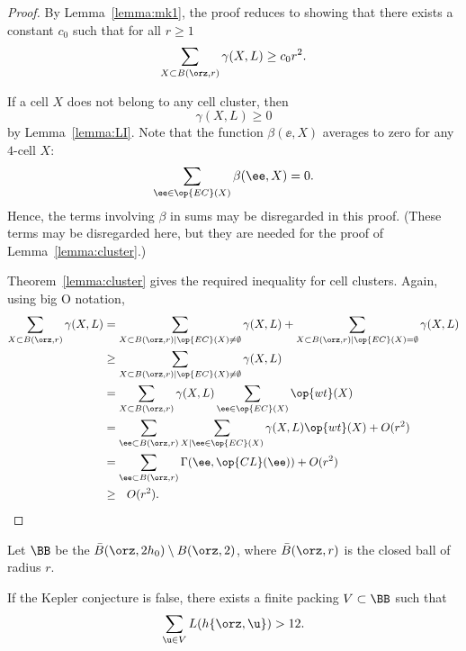 \begin{proof} 
  By Lemma~\ref{lemma:mk1}, the proof reduces to showing that there
  exists a constant $c_0$ such that for all $r\ge1$
\[
\sum_{X\subset B(\orz,r)} \gamma(X,L) \ge c_0 r^2.
\]

If a cell $X$ does not belong to any cell cluster, then
\[ 
\gamma(X,L)\ge 0
\] 
by Lemma~\ref{lemma:LI}.  Note that the function
$\beta(\ee,X)$ averages to zero for any $4$-cell $X$:
\[  
\sum_{\ee\in \op{EC}(X)} \beta(\ee,X) = 0.
\] 
Hence, the terms involving $\beta$ in sums may be disregarded in this
proof.  (These terms may be disregarded here, but they are needed for
the proof of Lemma~\ref{lemma:cluster}.)

Theorem~\ref{lemma:cluster} gives the required inequality for cell
clusters.  Again, using big O notation,
\begin{align*} 
\sum_{X\subset B(\orz,r)} \gamma(X,L) &=
\sum_{X\subset B(\orz,r)\mid \op{EC}(X)\ne\emptyset} \gamma(X,L) +
\sum_{X\subset B(\orz,r)\mid \op{EC}(X)=\emptyset} \gamma(X,L) \vspace{6pt}\\
&\ge \sum_{X\subset B(\orz,r)\mid \op{EC}(X)\ne\emptyset} \gamma(X,L)\vspace{6pt} \\
&=\sum_{X\subset B(\orz,r)}\gamma(X,L)\sum_{\ee \in \op{EC}(X)}\op{wt}(X) \vspace{6pt}\\
&=\sum_{\ee\subset B(\orz,r)}\sum_{X\mid \ee \in \op{EC}(X)}\gamma(X,L)\op{wt}(X) + O(r^2)\vspace{6pt}\\
&=\sum_{\ee\subset B(\orz,r)}\Gamma(\ee,\op{CL}(\ee)) + O(r^2)\vspace{6pt}\\
&\ge ~~O(r^2).
\end{align*}
\end{proof}

\begin{definition}[$\BB$] 
   Let $\BB$ be the 
  $\bar B(\orz,2h_0)\setminus B(\orz,2)$, where $\bar B(\orz,r)$ is
  the closed ball of radius $r$.  
\end{definition}


\begin{corollary}\label{cor:CE} 
  If the Kepler conjecture is false, there exists a finite packing
  $V\subset\BB$ such that
\begin{equation}\label{eqn:CE} 
\sum_{ \u\in V} L(h\{\orz, \u\}) > 12.
\end{equation}
\end{corollary}

